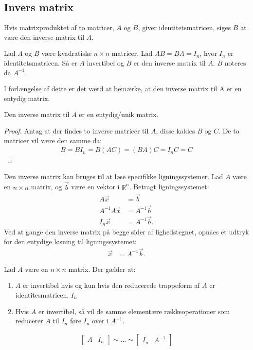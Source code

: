 \subsection{Invers matrix}
Hvis matrixproduktet af to matricer, $A$ og $B$, giver identitetsmatricen, siges $B$ at være den inverse matrix til $A$. 
\begin{defn}
Lad $A$ og $B$ være kvadratiske $n \times n$ matricer. Lad $AB=BA=I_n$, hvor $I_n$ er identitetsmatricen. Så er $A$ invertibel og $B$ er den inverse matrix til $A$. $B$ noteres da $A^{-1}$. 
\label{def(inversmatrix)}
\end{defn}
I forlængelse af dette er det værd at bemærke, at den inverse matrix til A er en entydig matrix.
\begin{stn}\label{stn:invers_unik}
Den inverse matrix til $A$ er en entydig/unik matrix. 
\end{stn}
\begin{proof}
Antag at der findes to inverse matricer til $A$, disse kaldes $B$ og $C$. De to matricer vil være den samme da: 
\begin{align*}
B=BI_n=B(AC)=(BA)C=I_nC=C
\end{align*}
\end{proof}
Den inverse matrix kan bruges til at løse specifikke ligningssystemer. Lad $A$ være en $n \times n$ matrix, og $\vec{b}$ være en vektor i $\mathds{R}^n$. Betragt ligningssystemet: 
\begin{align*}
A \vec{x} &= \vec{b}\\
A^{-1} A \vec{x} &= A^{-1} \vec{b}\\
I_n \vec{x} &= A^{-1} \vec{b}.
\end{align*} 
Ved at gange den inverse matrix på begge sider af lighedstegnet, opnåes et udtryk for den entydige løsning til ligningssystemet: 
\begin{align}
\vec{x} &= A^{-1} \vec{b}.
\end{align} 

\begin{stn}
Lad $A$ være en $n \times n$ matrix. Der gælder at: 
\begin{enumerate}[label=(\alph*)]
\item $A$ er invertibel hvis og kun hvis den reducerede trappeform af $A$ er identitesmatricen, $I_n$
\item Hvis $A$ er invertibel, så vil de samme elementære rækkeoperationer som reducerer $A$ til $I_n$ føre $I_n$ over i $A^{-1}$.  
\end{enumerate}
\begin{align*}
\begin{bmatrix}
A & I_n
\end{bmatrix} \sim \dots \sim
\begin{bmatrix}
I_n & A^{-1}
\end{bmatrix}
\end{align*}
\label{stn:inversmatrix}
\end{stn}

